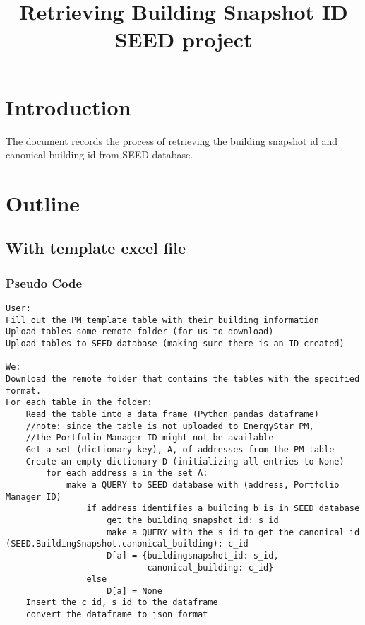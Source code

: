 \documentclass[12pt]{article}
\begin{document}
\title{Retrieving Building Snapshot ID\\
       \large SEED project}
\maketitle
\tableofcontents
\newpage
\section{Introduction}\label{sec:intro}
The document records the process of retrieving the building snapshot
id and canonical building id from SEED database.

\section{Outline}\label{sec:outline}
\subsection{With template excel file}
\subsubsection{Pseudo Code}
\makeatletter
\def\verbatim@font{\linespread{1}\small\ttfamily}
\begin{verbatim}
User:
Fill out the PM template table with their building information
Upload tables some remote folder (for us to download)
Upload tables to SEED database (making sure there is an ID created)

We:
Download the remote folder that contains the tables with the specified format.
For each table in the folder:
    Read the table into a data frame (Python pandas dataframe)
    //note: since the table is not uploaded to EnergyStar PM, 
    //the Portfolio Manager ID might not be available
    Get a set (dictionary key), A, of addresses from the PM table
    Create an empty dictionary D (initializing all entries to None)
        for each address a in the set A:
            make a QUERY to SEED database with (address, Portfolio Manager ID) 
                if address identifies a building b is in SEED database
                    get the building snapshot id: s_id
                    make a QUERY with the s_id to get the canonical id (SEED.BuildingSnapshot.canonical_building): c_id
                    D[a] = {buildingsnapshot_id: s_id,
                            canonical_building: c_id}
                else 
                    D[a] = None
    Insert the c_id, s_id to the dataframe
    convert the dataframe to json format
\end{verbatim}
\end{document}
